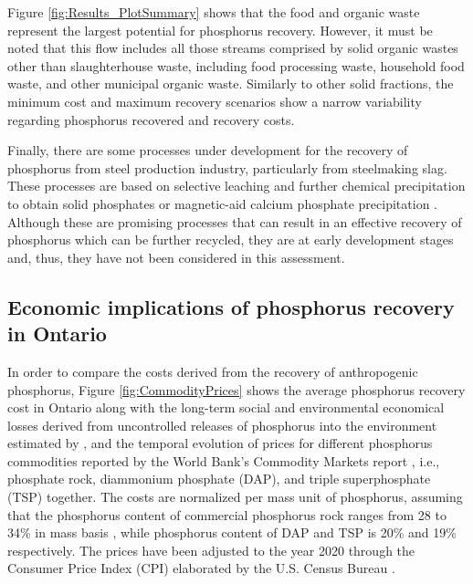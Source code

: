 \documentclass[authoryear]{elsarticle}
\begin{document}
Figure \ref{fig:Results_PlotSummary} shows that the food and organic waste represent the largest potential for phosphorus recovery. However, it must be noted that this flow includes all those streams comprised by solid organic wastes other than slaughterhouse waste, including food processing waste, household food waste, and other municipal organic waste. Similarly to other solid fractions, the minimum cost and maximum recovery scenarios show a narrow variability regarding phosphorus recovered and recovery costs.

Finally, there are some processes under development for the recovery of phosphorus from steel production industry, particularly from steelmaking slag. These processes are based on selective leaching and further chemical precipitation to obtain solid phosphates \citep{du2022recovery, du2019separation} or magnetic-aid calcium phosphate precipitation \citep{yokoyama2007separation}. Although these are promising processes that can result in an effective recovery of phosphorus which can be further recycled, they are at early development stages and, thus, they have not been considered in this assessment.

\subsection{Economic implications of phosphorus recovery in Ontario}
In order to compare the costs derived from the recovery of anthropogenic phosphorus, Figure \ref{fig:CommodityPrices} shows the average phosphorus recovery cost in Ontario
along with the long-term social and environmental economical losses derived from uncontrolled releases of phosphorus into the environment estimated by \citet{sampat2021valuing},
and
the temporal evolution of prices for different phosphorus commodities reported by the World Bank's Commodity Markets report \citep{CommoditiesPrices}, i.e., phosphate rock, diammonium phosphate (DAP), and triple superphosphate (TSP) together. The costs are normalized per mass unit of phosphorus, assuming that the phosphorus content of commercial phosphorus rock ranges from 28 to 34\% in mass basis \citep{FAO_PUses, UMin_P}, while phosphorus content of DAP and TSP is 20\% and 19\% respectively. The prices have been adjusted to the year 2020 through the Consumer Price Index (CPI) elaborated by the U.S. Census Bureau \citep{CPIIndex}.
\end{document}
